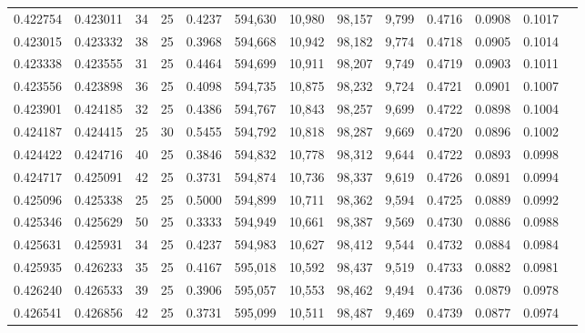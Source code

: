 \begin{tabular}{rrrrrrrrrrrrr}
0.422754 & 0.423011 &    34 &  25 &                                     0.4237 & 594,630 &  10,980 &  98,157 &   9,799 & 0.4716 & 0.0908 & 0.1017 \\
0.423015 & 0.423332 &    38 &  25 &                                     0.3968 & 594,668 &  10,942 &  98,182 &   9,774 & 0.4718 & 0.0905 & 0.1014 \\
0.423338 & 0.423555 &    31 &  25 &                                     0.4464 & 594,699 &  10,911 &  98,207 &   9,749 & 0.4719 & 0.0903 & 0.1011 \\
0.423556 & 0.423898 &    36 &  25 &                                     0.4098 & 594,735 &  10,875 &  98,232 &   9,724 & 0.4721 & 0.0901 & 0.1007 \\
0.423901 & 0.424185 &    32 &  25 &                                     0.4386 & 594,767 &  10,843 &  98,257 &   9,699 & 0.4722 & 0.0898 & 0.1004 \\
0.424187 & 0.424415 &    25 &  30 &                                     0.5455 & 594,792 &  10,818 &  98,287 &   9,669 & 0.4720 & 0.0896 & 0.1002 \\
0.424422 & 0.424716 &    40 &  25 &                                     0.3846 & 594,832 &  10,778 &  98,312 &   9,644 & 0.4722 & 0.0893 & 0.0998 \\
0.424717 & 0.425091 &    42 &  25 &                                     0.3731 & 594,874 &  10,736 &  98,337 &   9,619 & 0.4726 & 0.0891 & 0.0994 \\
0.425096 & 0.425338 &    25 &  25 &                                     0.5000 & 594,899 &  10,711 &  98,362 &   9,594 & 0.4725 & 0.0889 & 0.0992 \\
0.425346 & 0.425629 &    50 &  25 &                                     0.3333 & 594,949 &  10,661 &  98,387 &   9,569 & 0.4730 & 0.0886 & 0.0988 \\
0.425631 & 0.425931 &    34 &  25 &                                     0.4237 & 594,983 &  10,627 &  98,412 &   9,544 & 0.4732 & 0.0884 & 0.0984 \\
0.425935 & 0.426233 &    35 &  25 &                                     0.4167 & 595,018 &  10,592 &  98,437 &   9,519 & 0.4733 & 0.0882 & 0.0981 \\
0.426240 & 0.426533 &    39 &  25 &                                     0.3906 & 595,057 &  10,553 &  98,462 &   9,494 & 0.4736 & 0.0879 & 0.0978 \\
0.426541 & 0.426856 &    42 &  25 &                                     0.3731 & 595,099 &  10,511 &  98,487 &   9,469 & 0.4739 & 0.0877 & 0.0974 \\

\end{tabular}
